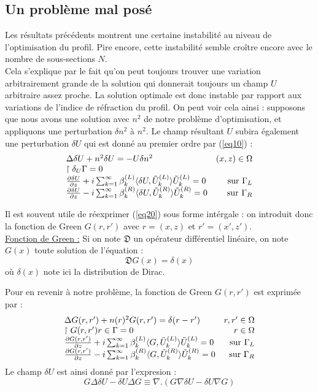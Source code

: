 \documentclass{article}
\begin{document}
\subsection{Un problème mal posé}
Les résultats précédents montrent une certaine instabilité au niveau de l'optimisation du profil. Pire encore, cette instabilité semble croître encore avec le nombre de sous-sections $N$.\\
Cela s'explique par le fait qu'on peut toujours trouver une variation arbitrairement grande de la solution qui donnerait toujours un champ $U$ arbitraire assez proche. La solution optimale est donc instable par rapport aux variations de l'indice de réfraction du profil.
On peut voir cela ainsi : supposons que nous avons une solution avec $n^2$ de notre problème d'optimisation, et appliquons une perturbation $\delta n^2$ à $n^2$. Le champ résultant $U$ subira également une perturbation $\delta U$ qui est donné au premier ordre par (\ref{eq10}) :
\begin{equation}\label{eq20}
\begin{array}{l r}
\Delta\delta U + n^2\delta U=-U\delta n^2 & (x,z)\in\Omega\\
\restriction{\delta_U}{\Gamma}=0\\
\frac{\partial \delta U}{\partial z} + i\sum_{k=1}^\infty \beta_k^{(L)}\langle \delta U,\tilde{U}_k^{(L)}\rangle \tilde{U}_k^{(L)} = 0 & \text{ sur }\Gamma_L\\
\frac{\partial \delta U}{\partial z} - i\sum_{k=1}^\infty \beta_k^{(R)}\langle \delta U,\tilde{U}_k^{(R)}\rangle \tilde{U}_k^{(R)} = 0 & \text{ sur }\Gamma_R\\
\end{array}
\end{equation}

Il est souvent utile de réexprimer (\ref{eq20}) sous forme intérgale : on introduit donc la fonction de Green $G(r,r')$ avec $r=(x,z)$ et $r'=(x',z')$.\\
\underline{Fonction de Green :} Si on note $\mathfrak{D}$ un opérateur différentiel linéaire, on note $G(x)$ toute solution de l'équation : 
\[\mathfrak{D} G(x)=\delta(x)\]
où $\delta(x)$ note ici la distribution de Dirac.

\bigskip
Pour en revenir à notre problème, la fonction de Green $G(r,r')$ est exprimée par :
\begin{equation}\label{eq21}
\begin{array}{l r}
\Delta G(r,r')+n(r)^2G(r,r')=\delta(r-r') & r,r'\in\Omega\\
\restriction{G(r,r')}{r\in\Gamma}=0 & r\in\Omega\\
\frac{\partial G(r,r')}{\partial z} + i\sum_{k=1}^\infty \beta_k^{(L)}\langle G,\tilde{U}_k^{(L)}\rangle \tilde{U}_k^{(L)} = 0 & \text{ sur }\Gamma_L\\
\frac{\partial G(r,r')}{\partial z} - i\sum_{k=1}^\infty \beta_k^{(R)}\langle G,\tilde{U}_k^{(R)}\rangle \tilde{U}_k^{(R)} = 0 & \text{ sur }\Gamma_R\\
\end{array}\end{equation}
Le champ $\delta U$ est ainsi donné par l'expresion : 
\[G\Delta\delta U - \delta U\Delta G\equiv \nabla .(G\nabla\delta U - \delta U\nabla G)\]
\end{document}
